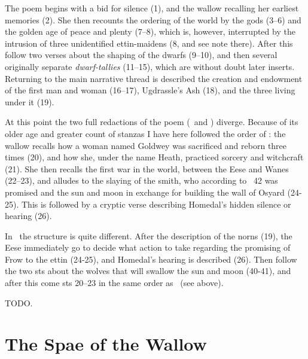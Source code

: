 \sectionline

The poem begins with a bid for silence (1), and the wallow recalling her earliest memories (2). She then recounts the ordering of the world by the gods (3–6) and the golden age of peace and plenty (7–8), which is, however, interrupted by the intrusion of three unidentified ettin-maidens (8, and see note there). After this follow two verses about the shaping of the dwarfs (9–10), and then several originally separate \emph{dwarf-tallies} (11–15), which are without doubt later inserts. Returning to the main narrative thread is described the creation and endowment of the first man and woman (16–17), Ugdrassle’s Ash (18), and the three  living under it (19).

At this point the two full redactions of the poem (\Regius\ and \Hauksbok) diverge. Because of its older age and greater count of stanzas I have here followed the order of \Regius: the wallow recalls how a woman named Goldwey was sacrificed and reborn three times (20), and how she, under the name Heath, practiced sorcery and witchcraft (21). She then recalls the first war in the world, between the Eese and Wanes (22–23), and alludes to the slaying of the smith, who according to \Gylfaginning\ 42 was promised  and the sun and moon in exchange for building the wall of Osyard (24-25). This is followed by a cryptic verse describing Homedal’s hidden silence or hearing (26).

In \Hauksbok\ the structure is quite different. After the description of the norns (19), the Eese immediately go to decide what action to take regarding the promising of Frow to the ettin (24-25), and Homedal’s hearing is described (26). Then follow the two sts about the wolves that will swallow the sun and moon (40-41), and after this come sts 20–23 in the same order as \Regius\ (see above).

TODO.

\sectionline

\section{The Spae of the Wallow}

